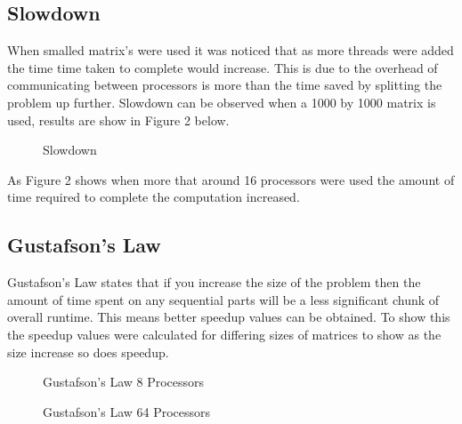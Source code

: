 \documentclass{article}
\begin{document}
\subsection{Slowdown}

When smalled matrix's were used it was noticed that as more threads were added the
time time taken to complete would increase. This is due to the overhead of communicating
between processors is more than the time saved by splitting the problem up further.
Slowdown can be observed when a 1000 by 1000 matrix is used, results are show in Figure 2
below.

\begin{figure}[H]
 \centering
 \caption{Slowdown}
 \label{fig:slowdown}
 \end{figure}

As Figure 2 shows when more that around 16 processors were used the amount of time
required to complete the computation increased.

\subsection{Gustafson's Law}

Gustafson's Law states that if you increase the size of the problem then the amount of
time spent on any sequential parts will be a less significant chunk of overall runtime.
This means better speedup values can be obtained. To show this the speedup values were
calculated for differing sizes of matrices to show as the size increase so does
speedup.

\begin{figure}[H]
 \centering
 \caption{Gustafson's Law 8 Processors}
 \label{fig:slowdown}
 \end{figure}

 \begin{figure}[H]
  \centering
  \caption{Gustafson's Law 64 Processors}
  \label{fig:slowdown}
  \end{figure}
\end{document}
